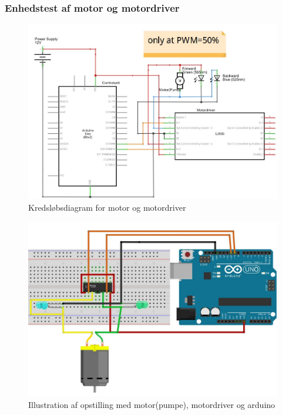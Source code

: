 \subsubsection{Enhedstest af motor og motordriver}

 \begin{figure}[H]
	\centering
	\includegraphics[width=1\textwidth]{billeder/Hardware/diagrammer/motordiagram.JPG}
	\caption{Kredsløbsdiagram for motor og motordriver}
	\label{fig:motordriverdiagram}
\end{figure}

 \begin{figure}[H]
	\centering
	\includegraphics[width=1\textwidth]{billeder/Hardware/diagrammer/Motorbreadboard.JPG}
	\caption{Illustration af opstilling med motor(pumpe), motordriver og arduino}
	\label{fig:Motorbreadboard}
\end{figure}

